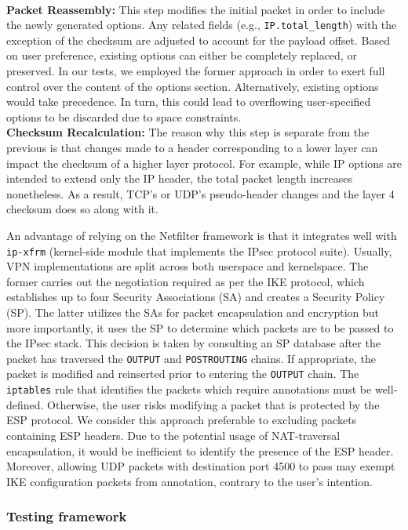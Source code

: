\\ \textbf{Packet Reassembly:} This step modifies the initial packet in order to include the newly generated options. Any related fields (e.g., \texttt{IP.total\_length}) with the exception of the checksum are adjusted to account for the payload offset. Based on user preference, existing options can either be completely replaced, or preserved. In our tests, we employed the former approach in order to exert full control over the content of the options section. Alternatively, existing options would take precedence. In turn, this could lead to overflowing user-specified options to be discarded due to space constraints.
\\ \textbf{Checksum Recalculation:} The reason why this step is separate from the previous is that changes made to a header corresponding to a lower layer can impact the checksum of a higher layer protocol. For example, while IP options are intended to extend only the IP header, the total packet length increases nonetheless. As a result, TCP's or UDP's pseudo-header changes and the layer 4 checksum does so along with it.

An advantage of relying on the Netfilter framework is that it integrates well with \texttt{ip-xfrm} (kernel-side module that implements the IPsec protocol suite). Usually, VPN implementations are split across both userspace and kernelspace. The former carries out the negotiation required as per the IKE protocol, which establishes up to four Security Associations (SA) and creates a Security Policy (SP). The latter utilizes the SAs for packet encapsulation and encryption but more importantly, it uses the SP to determine which packets are to be passed to the IPsec stack. This decision is taken by consulting an SP database after the packet has traversed the \texttt{OUTPUT} and \texttt{POSTROUTING} chains. If appropriate, the packet is modified and reinserted prior to entering the \texttt{OUTPUT} chain. The \texttt{iptables} rule that identifies the packets which require annotations must be well-defined. Otherwise, the user risks modifying a packet that is protected by the ESP protocol. We consider this approach preferable to excluding packets containing ESP headers. Due to the potential usage of NAT-traversal encapsulation, it would be inefficient to identify the presence of the ESP header. Moreover, allowing UDP packets with destination port 4500 to pass may exempt IKE configuration packets from annotation, contrary to the user's intention.

\subsubsection{Testing framework}
\label{extend:ops:architecture:cloud}

